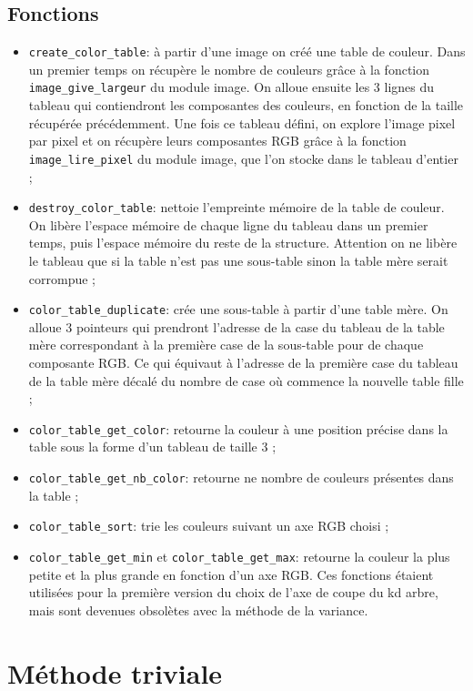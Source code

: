 \documentclass[a4paper,11pt,final]{article}
\begin{document}
\subsection{Fonctions}

\begin{itemize}
\item\texttt{create\_color\_table}: à partir d’une image on créé une table de couleur. Dans un premier temps on récupère le nombre de couleurs grâce à la fonction \texttt{image\_give\_largeur} du module image. On alloue ensuite les 3 lignes du tableau qui contiendront les composantes des couleurs, en fonction de la taille récupérée précédemment. Une fois ce tableau défini, on explore l’image pixel par pixel et on récupère leurs composantes RGB grâce à la fonction \texttt{image\_lire\_pixel} du module image, que l’on stocke dans le tableau d’entier ;
\item\texttt{destroy\_color\_table}: nettoie l’empreinte mémoire de la table de couleur. On libère l’espace mémoire de chaque ligne du tableau dans un premier temps, puis l’espace mémoire du reste de la structure. Attention on ne libère le tableau que si la table n’est pas une sous-table sinon la table mère serait corrompue ;
\item\texttt{color\_table\_duplicate}: crée une sous-table à partir d’une table mère. On alloue 3 pointeurs qui prendront l’adresse de la case du tableau de la table mère correspondant à la première case de la sous-table pour de chaque composante RGB. Ce qui équivaut à l’adresse de la première case du tableau de la table mère décalé du nombre de case où commence la nouvelle table fille ;
\item\texttt{color\_table\_get\_color}: retourne la couleur à une position précise dans la table sous la forme d’un tableau de taille 3 ;
\item\texttt{color\_table\_get\_nb\_color}: retourne ne nombre de couleurs présentes dans la table ;
\item\texttt{color\_table\_sort}: trie les couleurs suivant un axe RGB choisi ;
\item\texttt{color\_table\_get\_min} et \texttt{color\_table\_get\_max}: retourne la couleur la plus petite et la plus grande en fonction d’un axe RGB. Ces fonctions étaient utilisées pour la première version du choix de l’axe de coupe du kd arbre, mais sont devenues obsolètes avec la méthode de la variance.
\end{itemize}

\section{Méthode triviale}
\end{document}
